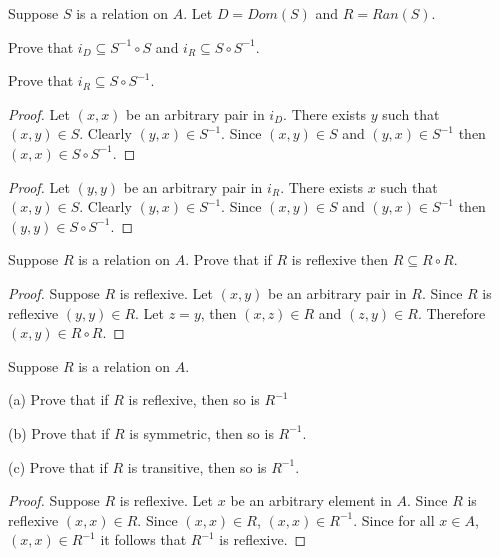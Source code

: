 \begin{tcolorbox}[title=Problem 10, breakable]
    Suppose $S$ is a relation on $A$.
    Let $D = Dom(S)$ and $R = Ran(S)$.

    Prove that $i_D \subseteq S^{-1} \circ S$
        and $i_R \subseteq S \circ S^{-1}$.

    Prove that $i_R \subseteq S \circ S^{-1}$.
\end{tcolorbox}

\begin{proof}
    Let $(x, x)$ be an arbitrary pair in $i_D$.
    There exists $y$ such that $(x, y) \in S$.
    Clearly $(y, x) \in S^{-1}$.
    Since $(x, y) \in S$ and $(y, x) \in S^{-1}$ 
        then $(x, x) \in S \circ S^{-1}$.
\end{proof}

\begin{proof}
    Let $(y, y)$ be an arbitrary pair in $i_R$.
    There exists $x$ such that $(x, y) \in S$.
    Clearly $(y, x) \in S^{-1}$.
    Since $(x, y) \in S$ and $(y, x) \in S^{-1}$ 
        then $(y, y) \in S \circ S^{-1}$.
\end{proof}

\begin{tcolorbox}[title=Problem 11, breakable]
    Suppose $R$ is a relation on $A$.
    Prove that if $R$ is reflexive then $R \subseteq R \circ R$.
\end{tcolorbox}

\begin{proof}
    Suppose $R$ is reflexive.
    Let $(x, y)$ be an arbitrary pair in $R$.
    Since $R$ is reflexive $(y, y) \in R$.
    Let $z = y$, then $(x, z) \in R$ and $(z, y) \in R$.
    Therefore $(x, y) \in R \circ R$.
\end{proof}

\begin{tcolorbox}[title=Problem 12, breakable]
    Suppose $R$ is a relation on $A$.

    (a) Prove that if $R$ is reflexive, then so is $R^{-1}$

    (b) Prove that if $R$ is symmetric, then so is $R^{-1}$.

    (c) Prove that if $R$ is transitive, then so is $R^{-1}$.
\end{tcolorbox}

\begin{proof}
    Suppose $R$ is reflexive.
    Let $x$ be an arbitrary element in $A$.
    Since $R$ is reflexive $(x, x) \in R$.
    Since $(x, x) \in R$, $(x, x) \in R^{-1}$.
    Since for all $x \in A$, $(x, x) \in R^{-1}$ it follows that $R^{-1}$ is reflexive.
\end{proof}

